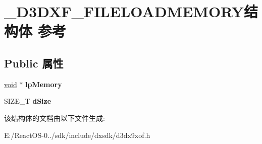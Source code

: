 \hypertarget{struct___d3_d_x_f___f_i_l_e_l_o_a_d_m_e_m_o_r_y}{}\section{\+\_\+\+D3\+D\+X\+F\+\_\+\+F\+I\+L\+E\+L\+O\+A\+D\+M\+E\+M\+O\+R\+Y结构体 参考}
\label{struct___d3_d_x_f___f_i_l_e_l_o_a_d_m_e_m_o_r_y}
\subsection*{Public 属性}
\begin{DoxyCompactItemize}
\item 
\mbox{\label{struct___d3_d_x_f___f_i_l_e_l_o_a_d_m_e_m_o_r_y_a189c2c0aeef10b58c5a1d55f7ef40575}} 
\hyperlink{interfacevoid}{void} $\ast$ {\bfseries lp\+Memory}
\item 
\mbox{\label{struct___d3_d_x_f___f_i_l_e_l_o_a_d_m_e_m_o_r_y_a89e1f6a6cb7d2a136ac43207ee7cbe0d}} 
S\+I\+Z\+E\+\_\+T {\bfseries d\+Size}
\end{DoxyCompactItemize}


该结构体的文档由以下文件生成\+:\begin{DoxyCompactItemize}
\item 
E\+:/\+React\+O\+S-\/0../sdk/include/dxsdk/d3dx9xof.\+h\end{DoxyCompactItemize}
